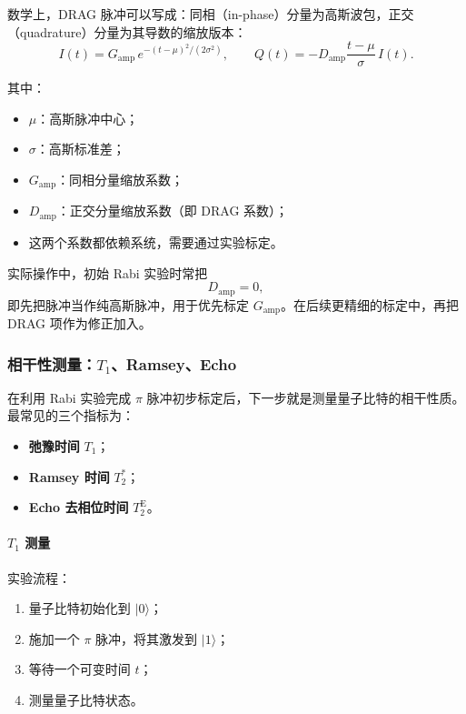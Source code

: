 \documentclass[12pt,a4paper,oneside]{ctexbook}
\begin{document}
数学上，DRAG 脉冲可以写成：同相（in-phase）分量为高斯波包，正交（quadrature）分量为其导数的缩放版本：
\begin{equation}
I(t)=G_{\mathrm{amp}}\,e^{-(t-\mu)^2/(2\sigma^2)},
\qquad
Q(t)=-D_{\mathrm{amp}}\frac{t-\mu}{\sigma}\,I(t).
\tag{52}
\end{equation}

其中：
\begin{itemize}
    \item \(\mu\)：高斯脉冲中心；
    \item \(\sigma\)：高斯标准差；
    \item \(G_{\mathrm{amp}}\)：同相分量缩放系数；
    \item \(D_{\mathrm{amp}}\)：正交分量缩放系数（即 DRAG 系数）；
    \item 这两个系数都依赖系统，需要通过实验标定。
\end{itemize}

实际操作中，初始 Rabi 实验时常把
\[
D_{\mathrm{amp}}=0,
\]
即先把脉冲当作纯高斯脉冲，用于优先标定 \(G_{\mathrm{amp}}\)。在后续更精细的标定中，再把 DRAG 项作为修正加入。

\subsubsection{相干性测量：\(T_1\)、Ramsey、Echo}

在利用 Rabi 实验完成 \(\pi\) 脉冲初步标定后，下一步就是测量量子比特的相干性质。最常见的三个指标为：
\begin{itemize}
    \item \textbf{弛豫时间} \(T_1\)；
    \item \textbf{Ramsey 时间} \(T_2^*\)；
    \item \textbf{Echo 去相位时间} \(T_2^{\mathrm{E}}\)。
\end{itemize}

\paragraph{\(T_1\) 测量}
实验流程：
\begin{enumerate}
    \item 量子比特初始化到 \(|0\rangle\)；
    \item 施加一个 \(\pi\) 脉冲，将其激发到 \(|1\rangle\)；
    \item 等待一个可变时间 \(t\)；
    \item 测量量子比特状态。
\end{enumerate}
\end{document}
